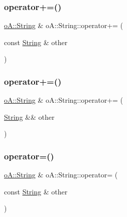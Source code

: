 \mbox{\label{classo_a_1_1_string_a748a9d3de7d14593f24d5e82fc306413}} 
\subsubsection{\texorpdfstring{operator+=()}{operator+=()}\hspace{0.1cm}{\footnotesize\ttfamily [1/2]}}
{\footnotesize\ttfamily \mbox{\hyperlink{classo_a_1_1_string}{o\+A\+::\+String}} \& o\+A\+::\+String\+::operator+= (\begin{DoxyParamCaption}\item[{const \mbox{\hyperlink{classo_a_1_1_string}{String}} \&}]{other }\end{DoxyParamCaption})\hspace{0.3cm}{\ttfamily [noexcept]}}

\mbox{\label{classo_a_1_1_string_a99849336461c58e51681c68acd1fcafc}} 
\subsubsection{\texorpdfstring{operator+=()}{operator+=()}\hspace{0.1cm}{\footnotesize\ttfamily [2/2]}}
{\footnotesize\ttfamily \mbox{\hyperlink{classo_a_1_1_string}{o\+A\+::\+String}} \& o\+A\+::\+String\+::operator+= (\begin{DoxyParamCaption}\item[{\mbox{\hyperlink{classo_a_1_1_string}{String}} \&\&}]{other }\end{DoxyParamCaption})\hspace{0.3cm}{\ttfamily [noexcept]}}

\mbox{\label{classo_a_1_1_string_ac979bb3953e566011543bd0ebe78e822}} 
\subsubsection{\texorpdfstring{operator=()}{operator=()}\hspace{0.1cm}{\footnotesize\ttfamily [1/2]}}
{\footnotesize\ttfamily \mbox{\hyperlink{classo_a_1_1_string}{o\+A\+::\+String}} \& o\+A\+::\+String\+::operator= (\begin{DoxyParamCaption}\item[{const \mbox{\hyperlink{classo_a_1_1_string}{String}} \&}]{other }\end{DoxyParamCaption})\hspace{0.3cm}{\ttfamily [noexcept]}}

